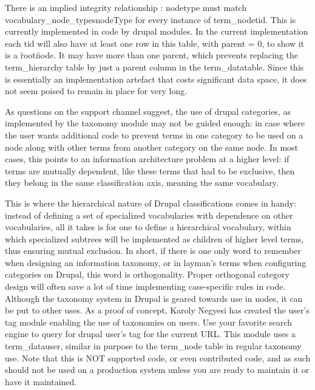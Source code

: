 There is an implied integrity relationship : node\/type must match vocabulary\_node\_types\/nodeType for every instance of term\_node\/tid. This is currently implemented in code by drupal modules. In the current implementation each tid will also have at least one row in this table, with parent = 0, to show it is a \"root\" node. It may have more than one parent, which prevents replacing the term\_hierarchy table by just a parent column in the term\_datatable. Since this is essentially an implementation artefact that costs significant data space, it does not seem poised to remain in place for very long.

As questions on the support channel suggest, the use of drupal categories, as implemented by the taxonomy module may not be guided enough: in case where the user wants additional code to prevent terms in one category to be used on a node along with other terms from another category on the same node. In most cases, this points to an information architecture problem at a higher level: if terms are mutually dependent, like these terms that had to be exclusive, then they belong in the same classification axis, meaning the same vocabulary.

This is where the hierarchical nature of Drupal classifications comes in handy: instead of defining a set of specialized vocabularies with dependence on other vocabularies, all it takes is for one to define a hierarchical vocabulary, within which specialized subtrees will be implemented as children of higher level terms, thus ensuring mutual exclusion. In short, if there is one only word to remember when designing an information taxonomy, or in layman's terms when configuring categories on Drupal, this word is orthogonality. Proper orthogonal category design will often save a lot of time implementing case-specific rules in code.
Although the taxonomy system in Drupal is geared towards use in nodes, it can be put to other uses. As a proof of concept, Karoly Negyesi has created the user's tag module enabling the use of taxonomies on users. Use your favorite search engine to query for drupal user's tag for the current URL. This module uses a term\_datauser, similar in purpose to the term\_node table in regular taxonomy use. Note that this is NOT supported code, or even contributed code, and as such should not be used on a production system unless you are ready to maintain it or have it maintained.


